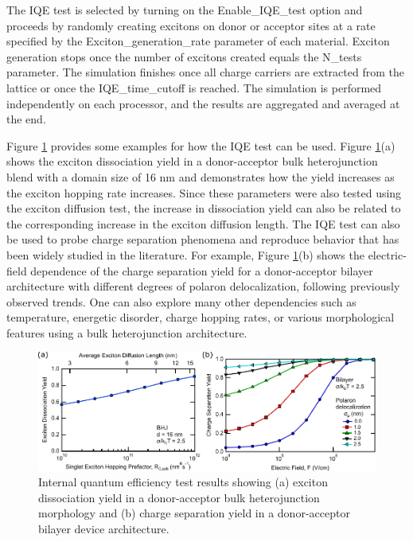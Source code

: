 \documentclass[%
 reprint,onecolumn,notitlepage,
superscriptaddress,longbibliography,
 amsmath,amssymb,
 aps,rmp,floatfix,
]{revtex4-1}
\begin{document}
The IQE test is selected by turning on the Enable\_IQE\_test option and proceeds by randomly creating excitons on donor or acceptor sites at a rate specified by the Exciton\_generation\_rate parameter of each material.
Exciton generation stops once the number of excitons created equals the N\_tests parameter.
The simulation finishes once all charge carriers are extracted from the lattice or once the IQE\_time\_cutoff is reached.
The simulation is performed independently on each processor, and the results are aggregated and averaged at the end.

Figure \ref{fig:IQE_example} provides some examples for how the IQE test can be used. Figure \ref{fig:IQE_example}(a) shows the exciton dissociation yield in a donor-acceptor bulk heterojunction blend with a domain size of 16 nm and demonstrates how the yield increases as the exciton hopping rate increases. 
Since these parameters were also tested using the exciton diffusion test, the increase in dissociation yield can also be related to the corresponding increase in the exciton diffusion length.
The IQE test can also be used to probe charge separation phenomena and reproduce behavior that has been widely studied in the literature.\cite{heiber2019chapter}
For example, Figure \ref{fig:IQE_example}(b) shows the electric-field dependence of the charge separation yield for a donor-acceptor bilayer architecture with different degrees of polaron delocalization, following previously observed trends.\cite{deibel2009prl}
One can also explore many other dependencies such as temperature, energetic disorder, charge hopping rates, or various morphological features using a bulk heterojunction architecture.

\begin{figure}[h]
    \centering
    \includegraphics{IQE_example_data.pdf}
    \caption{Internal quantum efficiency test results showing (a) exciton dissociation yield in a donor-acceptor bulk heterojunction morphology and (b) charge separation yield in a donor-acceptor bilayer device architecture.}
    \label{fig:IQE_example}
\end{figure}
\end{document}
